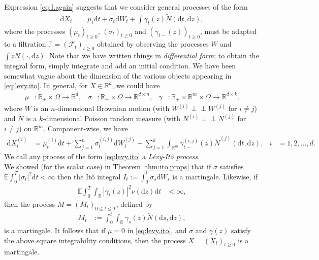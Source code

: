 \documentclass[12pt]{book}
\numberwithin{equation}{chapter}
\theoremstyle{plain}
\numberwithin{theorem}{section}
\theoremstyle{definition}
\numberwithin{exercise}{chapter}
\newcommand{\<}{\langle}
\renewcommand{\>}{\rangle}
\renewcommand{\(}{\left(}
\renewcommand{\)}{\right)}
\renewcommand{\[}{\left[}
\renewcommand{\]}{\right]}
\newcommand\Eb{\mathds{E}}
\newcommand\Fb{\mathds{F}}
\newcommand\Rb{\mathds{R}}
\newcommand\Fc{\mathscr{F}}
\newcommand\Om{\Omega}
\newcommand\sig{\sigma}
\newcommand\gam{\gamma}
\newcommand\Nt{\widetilde{N}}
\newcommand{\ind}{\perp \! \! \! \perp}
\newcommand\dd{\mathrm{d}}
\begin{document}
Expression \eqref{eq:I.again} suggests that we consider general processes of the form
\begin{align}
\dd X_t
	&=	\mu_t \dd t + \sig_t \dd W_t + \int \gam_{t}(z) \Nt( \dd t , \dd z ) , \label{eq:levy.ito}
\end{align}
where the processes $(\mu_t)_{t \geq 0}$, $(\sig_t)_{t \geq 0}$ and $(\gam_{t-}(z))_{t \geq 0}$, must be adapted to a filtration $\Fb=(\Fc_t)_{t \geq 0}$ obtained by observing the processes $W$ and $\int z N( \cdot ,\dd z)$.  Note that we have written things in \emph{differential form}; to obtain the integral form, simply integrate and add an initial condition.  We have been somewhat vague about the dimension of the various objects appearing in \eqref{eq:levy.ito}.  In general, for $X \in \Rb^d$, we could have
\begin{align}
\mu
	&: \Rb_+ \times \Om \to  \Rb^d , &
\sig
	&: \Rb_+ \times \Om \to \Rb^{d \times n} , &
\gam
	&: \Rb_+ \times \Rb^m \times \Om \to \Rb^{d \times k} .
\end{align}
where $W$ is an $n$-dimensional Brownian motion (with $W^{(i)} \ind W^{(j)}$ for $i \neq j$) and $\Nt$ is a $k$-dimensional Poisson random measure (with $N^{(i)} \ind N^{(j)}$ for $i \neq j$) on $\Rb^m$.  Component-wise, we have
\begin{align}
\dd X_t^{(i)}
	&=	\mu_t^{(i)} \dd t + \sum_{j=1}^n \sig_t^{(i,j)} \dd W_t^{(j)} + \sum_{j=1}^k \int_{\Rb^m} \gam_{t-}^{(i,j)}(z) \Nt^{(j)}( \dd t , \dd z ) , &
i
	&= 1, 2, \ldots, d .
\end{align}
We call any process of the form \eqref{eq:levy.ito} a \emph{L\'evy-It\^o process}.  
\\[0.5em]
We showed (for the scalar case) in Theorem \ref{thm:ito.props} that if $\sig$ satisfies $\Eb \int_0^T |\sig_t|^2 \dd t < \infty$ then the It\^o integral $I_t := \int_0^t \sig_s \dd W_s$ is a martingale.  Likewise, if
\begin{align}
\Eb \int_0^T \int_\Rb |\gam_t(z)|^2 \nu( \dd z) \dd t
	&< \infty  ,
\end{align}
then the process $M = (M_t)_{0 \leq t \leq T}$, defined by
\begin{align}
M_t
	&:=	\int_0^t \int_\Rb \gam_s(z) \Nt(\dd s,\dd z) ,
\end{align}
is a martingale.  It follows that if $\mu = 0$ in \eqref{eq:levy.ito}, and $\sig$ and $\gam(z)$ satisfy the above square integrability conditions, then the process $X = (X_t)_{t \geq 0}$ is a martingale.
\end{document}
